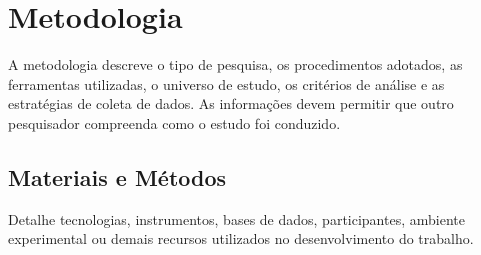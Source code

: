 \section{Metodologia}
A metodologia descreve o tipo de pesquisa, os procedimentos adotados, as ferramentas utilizadas, o universo de estudo, os critérios de análise e as estratégias de coleta de dados. As informações devem permitir que outro pesquisador compreenda como o estudo foi conduzido.

\subsection{Materiais e Métodos}
Detalhe tecnologias, instrumentos, bases de dados, participantes, ambiente experimental ou demais recursos utilizados no desenvolvimento do trabalho.